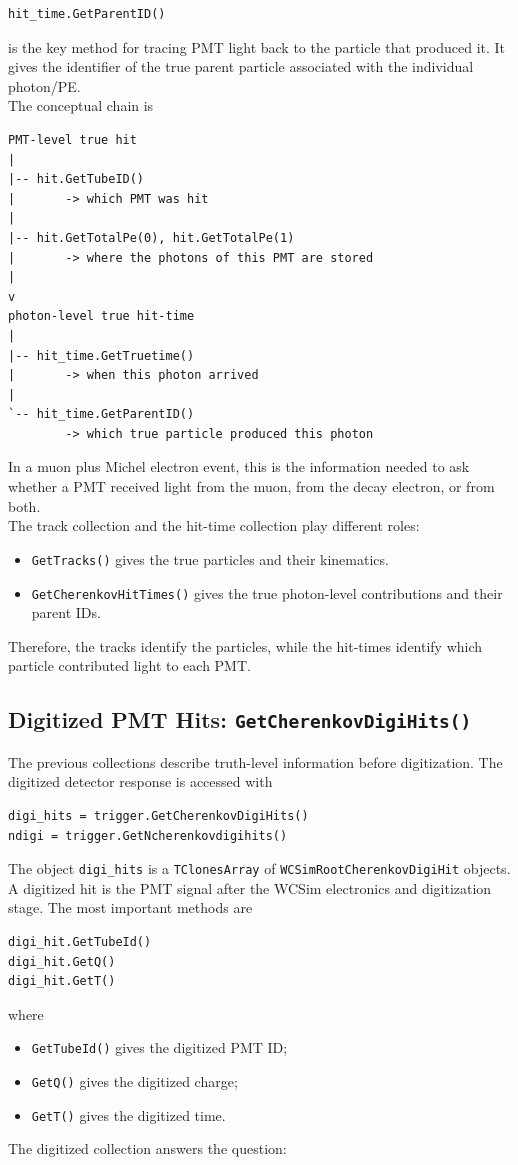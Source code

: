 \documentclass{article}
\numberwithin{table}{subsection}
\numberwithin{figure}{subsection}
\numberwithin{equation}{subsection}
\numberwithin{footnote}{subsection}
\begin{document}
\begin{lstlisting}
hit_time.GetParentID()
\end{lstlisting}
is the key method for tracing PMT light back to the particle that produced it.
It gives the identifier of the true parent particle associated with the
individual photon/PE.\\
The conceptual chain is
\begin{lstlisting}
PMT-level true hit
|
|-- hit.GetTubeID()
|       -> which PMT was hit
|
|-- hit.GetTotalPe(0), hit.GetTotalPe(1)
|       -> where the photons of this PMT are stored
|
v
photon-level true hit-time
|
|-- hit_time.GetTruetime()
|       -> when this photon arrived
|
`-- hit_time.GetParentID()
        -> which true particle produced this photon
\end{lstlisting}
In a muon plus Michel electron event, this is the information needed to ask
whether a PMT received light from the muon, from the decay electron, or from
both.\\
The track collection and the hit-time collection play different roles:

\begin{itemize}
    \item \texttt{GetTracks()} gives the true particles and their kinematics.
    \item \texttt{GetCherenkovHitTimes()} gives the true photon-level
    contributions and their parent IDs.
\end{itemize}
Therefore, the tracks identify the particles, while the hit-times identify which
particle contributed light to each PMT.

\subsection{Digitized PMT Hits: \texttt{GetCherenkovDigiHits()}}

The previous collections describe truth-level information before digitization.
The digitized detector response is accessed with

\begin{lstlisting}
digi_hits = trigger.GetCherenkovDigiHits()
ndigi = trigger.GetNcherenkovdigihits()
\end{lstlisting}
The object \texttt{digi\_hits} is a \texttt{TClonesArray} of
\texttt{WCSimRootCherenkovDigiHit} objects.\\
A digitized hit is the PMT signal after the WCSim electronics and digitization
stage. The most important methods are
\begin{lstlisting}
digi_hit.GetTubeId()
digi_hit.GetQ()
digi_hit.GetT()
\end{lstlisting}
where
\begin{itemize}
    \item \texttt{GetTubeId()} gives the digitized PMT ID;
    \item \texttt{GetQ()} gives the digitized charge;
    \item \texttt{GetT()} gives the digitized time.
\end{itemize}
The digitized collection answers the question:
\end{document}
